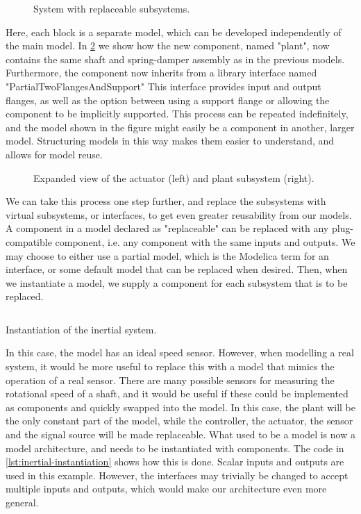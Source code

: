 \documentclass[\rootfolder/main.tex]{subfiles}
\begin{document}
\begin{figure}[ht]
    \caption{System with replaceable subsystems.\label{fig:inertial-architecture}}
\end{figure}

Here, each block is a separate model, which can be developed independently of the main model.
In \cref{fig:inertial-architecture-blowup} we show how the new component, named "plant", now contains the same shaft and spring-damper assembly as in the previous models.
Furthermore, the component now inherits from a library interface named "PartialTwoFlangesAndSupport"
This interface provides input and output flanges, as well as the option between using a support flange or allowing the component to be implicitly supported.
This process can be repeated indefinitely, and the model shown in the figure might easily be a component in another, larger model.
Structuring models in this way makes them easier to understand, and allows for model reuse.

\begin{figure}[ht]
    \scriptsize
    \caption{Expanded view of the actuator (left) and plant subsystem (right).\label{fig:inertial-architecture-blowup}}
\end{figure}

We can take this process one step further, and replace the subsystems with virtual subsystems, or interfaces, to get even greater reusability from our models.
A component in a model declared as "replaceable" can be replaced with any plug-compatible component, i.e. any component with the same inputs and outputs.
We may choose to either use a partial model, which is the Modelica term for an interface, or some default model that can be replaced when desired.
Then, when we instantiate a model, we supply a component for each subsystem that is to be replaced.

\begin{listing}[ht]
    \inputminted[fontsize=\footnotesize]{Modelica}{\rootfolder/Models/MasterProject/Models/InertialImplementation.mo}
    \caption{Instantiation of the inertial system.\label{lst:inertial-instantiation}}
\end{listing}

In this case, the model has an ideal speed sensor. 
However, when modelling a real system, it would be more useful to replace this with a model that mimics the operation of a real sensor.
There are many possible sensors for measuring the rotational speed of a shaft, and it would be useful if these could be implemented as components and quickly swapped into the model.
In this case, the plant will be the only constant part of the model, while the controller, the actuator, the sensor and the signal source will be made replaceable.
What used to be a model is now a model architecture, and needs to be instantiated with components.
The code in \cref{lst:inertial-instantiation} shows how this is done.
Scalar inputs and outputs are used in this example.
However, the interfaces may trivially be changed to accept multiple inputs and outputs, which would make our architecture even more general.
\end{document}
